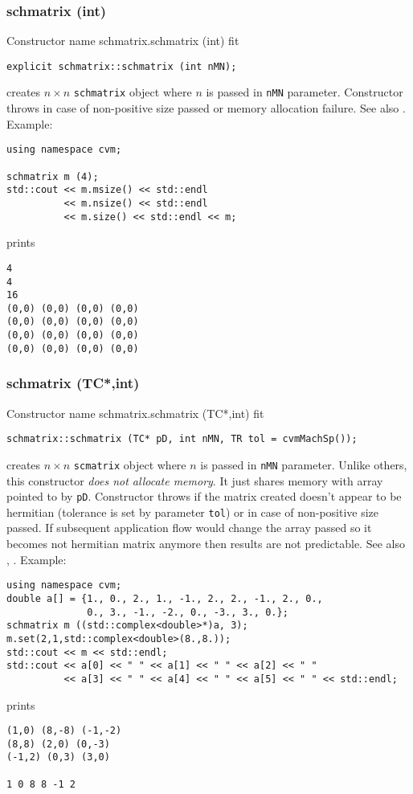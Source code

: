 \subsubsection{schmatrix (int)}
Constructor%
\pdfdest name {schmatrix.schmatrix (int)} fit
\begin{verbatim}
explicit schmatrix::schmatrix (int nMN);
\end{verbatim}
creates  $n\times n$ \verb"schmatrix" object where $n$ is passed in
\verb"nMN" parameter.
Constructor throws  
in case of non-positive size passed or memory allocation failure.
See also .
Example:
\begin{Verbatim}
using namespace cvm;

schmatrix m (4);
std::cout << m.msize() << std::endl 
          << m.nsize() << std::endl
          << m.size() << std::endl << m;
\end{Verbatim}
prints
\begin{Verbatim}
4
4
16
(0,0) (0,0) (0,0) (0,0)
(0,0) (0,0) (0,0) (0,0)
(0,0) (0,0) (0,0) (0,0)
(0,0) (0,0) (0,0) (0,0)
\end{Verbatim}
\newpage




\subsubsection{schmatrix (TC*,int)}
Constructor%
\pdfdest name {schmatrix.schmatrix (TC*,int)} fit
\begin{verbatim}
schmatrix::schmatrix (TC* pD, int nMN, TR tol = cvmMachSp());
\end{verbatim}
creates  $n\times n$ \verb"scmatrix" object where $n$ is passed in
\verb"nMN" parameter.
Unlike others, this constructor \textit{does not allocate  memory}.
It just shares  memory with  array pointed to by \verb"pD".
Constructor throws  
if the matrix created doesn't appear to be hermitian (tolerance is set by
parameter \verb'tol') or in case of non-positive size passed. 
If subsequent application flow would change the array passed so
it becomes not  hermitian matrix anymore then results are not predictable.
See also ,
.
Example:
\begin{Verbatim}
using namespace cvm;
double a[] = {1., 0., 2., 1., -1., 2., 2., -1., 2., 0.,
              0., 3., -1., -2., 0., -3., 3., 0.};
schmatrix m ((std::complex<double>*)a, 3);
m.set(2,1,std::complex<double>(8.,8.));
std::cout << m << std::endl;
std::cout << a[0] << " " << a[1] << " " << a[2] << " "
          << a[3] << " " << a[4] << " " << a[5] << " " << std::endl;
\end{Verbatim}
prints
\begin{Verbatim}
(1,0) (8,-8) (-1,-2)
(8,8) (2,0) (0,-3)
(-1,2) (0,3) (3,0)

1 0 8 8 -1 2
\end{Verbatim}
\newpage



